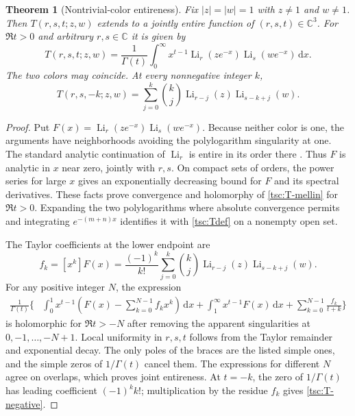 \documentclass[11pt]{article}
\numberwithin{equation}{section}
\newtheorem{theorem}{Theorem}[section]
\theoremstyle{definition}\newtheorem{definition}[theorem]{Definition}
\theoremstyle{remark}\newtheorem{remark}[theorem]{Remark}
\DeclareMathOperator{\Li}{Li}
\newcommand{\dd}{\,\mathrm d}
\newcommand{\CC}{\mathbb C}
\begin{document}
\begin{theorem}[Nontrivial-color entireness]\label{tsc:T-entire}
Fix $|z|=|w|=1$ with $z\ne1$ and $w\ne1$. Then
$T(r,s,t;z,w)$ extends to a jointly entire function of $(r,s,t)\in\CC^3$.
For $\Re t>0$ and arbitrary $r,s\in\CC$ it is given by
\begin{equation}\label{tsc:T-mellin}
 T(r,s,t;z,w)=\frac1{\Gamma(t)}
   \int_0^\infty x^{t-1}\Li_r(ze^{-x})\Li_s(we^{-x})\dd x.
\end{equation}
The two colors may coincide. At every nonnegative integer $k$,
\begin{equation}\label{tsc:T-negative}
 T(r,s,-k;z,w)=\sum_{j=0}^k\binom{k}{j}
                \Li_{r-j}(z)\Li_{s-k+j}(w).
\end{equation}
\end{theorem}
\begin{proof}
Put $F(x)=\Li_r(ze^{-x})\Li_s(we^{-x})$. Because neither color is one,
the arguments have neighborhoods avoiding the polylogarithm singularity
at one. The standard analytic continuation of $\Li_r$ is entire in its
order there \cite{tsc:dlmf-poly}. Thus $F$ is analytic in $x$ near zero,
jointly with $r,s$. On compact sets of orders, the power series for large
$x$ gives an exponentially decreasing bound for $F$ and its spectral
derivatives. These facts prove convergence and holomorphy of
\eqref{tsc:T-mellin} for $\Re t>0$. Expanding the two polylogarithms where
absolute convergence permits and integrating $e^{-(m+n)x}$ identifies it
with \eqref{tsc:Tdef} on a nonempty open set.

The Taylor coefficients at the lower endpoint are
\begin{equation}\label{tsc:Fcoeff}
 f_k=[x^k]F(x)=\frac{(-1)^k}{k!}
        \sum_{j=0}^k\binom{k}{j}
                   \Li_{r-j}(z)\Li_{s-k+j}(w).
\end{equation}
For any positive integer $N$, the expression
\begin{align}\label{tsc:T-subtracted}
 \frac1{\Gamma(t)}\bigg\{&
  \int_0^1 x^{t-1}\left(F(x)-\sum_{k=0}^{N-1}f_kx^k\right)\dd x
  +\int_1^\infty x^{t-1}F(x)\dd x
  +\sum_{k=0}^{N-1}\frac{f_k}{t+k}\bigg\}
\end{align}
is holomorphic for $\Re t>-N$ after removing the apparent singularities
at $0,-1,\ldots,-N+1$. Local uniformity in $r,s,t$ follows from the Taylor
remainder and exponential decay. The only poles of the braces are the
listed simple ones, and the simple zeros of $1/\Gamma(t)$ cancel them.
The expressions for different $N$ agree on overlaps, which proves joint
entireness. At $t=-k$, the zero of $1/\Gamma(t)$ has leading coefficient
$(-1)^k k!$; multiplication by the residue $f_k$ gives
\eqref{tsc:T-negative}.
\end{proof}
\end{document}
